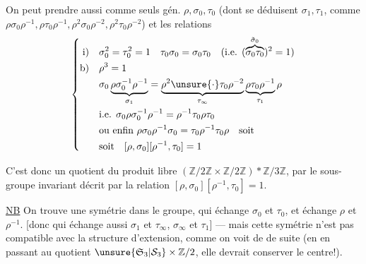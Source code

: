 On peut prendre aussi comme seuls gén. $\rho,\sigma_0,\tau_0$ (dont se déduisent $\sigma_1,\tau_1$, \inserted{$\sigma_\infty,\tau_\infty$,} comme $\rho\sigma_0\rho^{-1},\rho\tau_0\rho^{-1},\rho^2\sigma_0\rho^{-2},\rho^2\tau_0\rho^{-2}$) et les relations
\[
\left\{\begin{aligned}
\text{i)}\quad&\sigma_0^2=\tau_0^2=1\quad\tau_0\sigma_0=\sigma_0\tau_0\quad\text{(i.e. }(\overbrace{\sigma_0\tau_0}^{\tilde\sigma_0})^2=1\text{)}\\
\text{b)}\quad&\rho^3=1\\
&\sigma_0\underbrace{\rho\sigma_0^{-1}\rho^{-1}}_{\sigma_1}=\underbrace{\rho^2\unsure{\cdot}\tau_0\rho^{-2}}_{\tau_\infty}\underbrace{\rho\tau_0\rho^{-1}}_{\tau_1}\rho\\
&\text{i.e. }\sigma_0\rho\sigma_0^{-1}\rho^{-1}=\rho^{-1}\tau_0\rho\tau_0\\
&\text{ou enfin }\rho\sigma_0\rho^{-1}\sigma_0=\tau_0\rho^{-1}\tau_0\rho\quad\text{soit}\\
&\text{soit}\quad[\rho,\sigma_0][\rho^{-1},\tau_0]=1
\end{aligned}\right.
\]

C'est donc un quotient du produit libre $(\mathbb Z/2\mathbb Z\times\mathbb Z/2\mathbb Z)*\mathbb Z/3\mathbb Z$, par le sous-groupe invariant décrit par la relation $[\rho,\sigma_0][\rho^{-1},\tau_0]=1$.

\uline{NB} On trouve une symétrie dans le groupe, qui échange $\sigma_0$ et $\tau_0$, et échange $\rho$ et $\rho^{-1}$. [donc qui échange aussi $\sigma_1$ et $\tau_\infty$, $\sigma_\infty$ et $\tau_1$] --- mais cette symétrie n'est pas compatible avec la structure d'extension, comme on voit de  de suite (en en passant au quotient $\unsure{\mathfrak S_3|\mathcal S_3}\times\mathbb Z/2$, elle devrait conserver le centre!).
